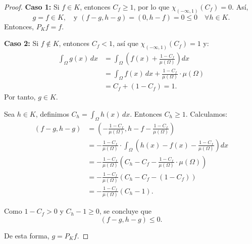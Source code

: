 \begin{itemize}
\begin{proof}
\medskip
\noindent
\textbf{Caso 1:} Si \( f \in K \), entonces \( C_f \geq 1 \), por lo que \( \chi_{(-\infty,1)}(C_f) = 0 \). Así,
\[
g = f \in K, \quad \text{y } (f - g, h - g) = (0, h - f) = 0 \leq 0 \quad \forall h \in K.
\]
Entonces, \( P_K f = f \).

\medskip
\noindent
\textbf{Caso 2:} Si \( f \notin K \), entonces \( C_f < 1 \), así que \( \chi_{(-\infty,1)}(C_f) = 1 \) y:
\begin{align*}
\int_{\Omega} g(x) \, dx &= \int_{\Omega} \left( f(x) + \frac{1 - C_f}{\mu(\Omega)} \right) dx \\
&= \int_{\Omega} f(x) \, dx + \frac{1 - C_f}{\mu(\Omega)} \cdot \mu(\Omega) \\
&= C_f + (1 - C_f) = 1.
\end{align*}
Por tanto, \( g \in K \).

Sea \( h \in K \), definimos \( C_h = \int_{\Omega} h(x) \, dx \). Entonces \( C_h \geq 1 \). Calculamos:
\begin{align*}
(f - g, h - g) &= \left( -\frac{1 - C_f}{\mu(\Omega)}, h - f - \frac{1 - C_f}{\mu(\Omega)} \right) \\
&= -\frac{1 - C_f}{\mu(\Omega)} \cdot \int_{\Omega} \left( h(x) - f(x) - \frac{1 - C_f}{\mu(\Omega)} \right) dx \\
&= -\frac{1 - C_f}{\mu(\Omega)} \left( C_h - C_f - \frac{1 - C_f}{\mu(\Omega)} \cdot \mu(\Omega) \right) \\
&= -\frac{1 - C_f}{\mu(\Omega)} (C_h - C_f - (1 - C_f)) \\
&= -\frac{1 - C_f}{\mu(\Omega)} (C_h - 1).
\end{align*}

Como \( 1 - C_f > 0 \) y \( C_h - 1 \geq 0 \), se concluye que
\[
(f - g, h - g) \leq 0.
\]

De esta forma, \( g = P_K f \).

    \end{proof}
\end{itemize}


